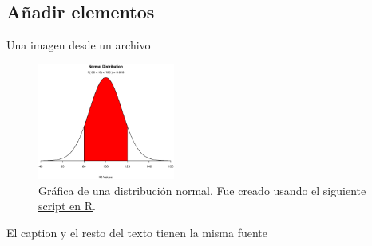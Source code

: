 \subsection{Añadir elementos}
\begin{frame}{Una imagen desde un archivo}
\begin{figure}[htb]
  \centering
  \includegraphics[width=0.4\textwidth]{img/normal}
\caption[Distribución normal]{Gráfica de una distribución normal. Fue creado usando el siguiente \href{https://www.statmethods.net/advgraphs/probability.html}{script en R}.}
\end{figure}
El caption y el resto del texto tienen la misma fuente
\end{frame}

